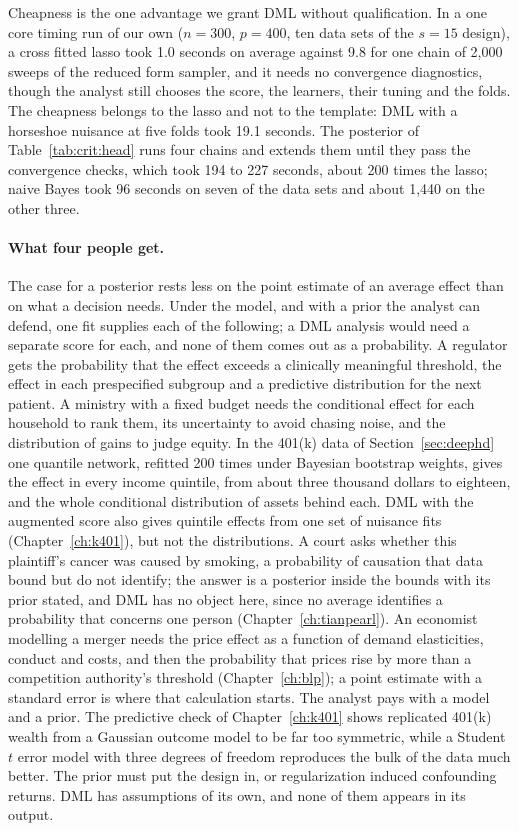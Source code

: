 Cheapness is the one advantage we grant DML without qualification. In a one core timing run of our own ($n = 300$, $p = 400$, ten data sets of the $s = 15$ design), a cross fitted lasso took 1.0 seconds on average against 9.8 for one chain of 2,000 sweeps of the reduced form sampler, and it needs no convergence diagnostics, though the analyst still chooses the score, the learners, their tuning and the folds. The cheapness belongs to the lasso and not to the template: DML with a horseshoe nuisance at five folds took 19.1 seconds. The posterior of Table~\ref{tab:crit:head} runs four chains and extends them until they pass the convergence checks, which took 194 to 227 seconds, about 200 times the lasso; naive Bayes took 96 seconds on seven of the data sets and about 1,440 on the other three.

\paragraph{What four people get.}\label{sec:crit:applied} The case for a posterior rests less on the point estimate of an average effect than on what a decision needs. Under the model, and with a prior the analyst can defend, one fit supplies each of the following; a DML analysis would need a separate score for each, and none of them comes out as a probability. A regulator gets the probability that the effect exceeds a clinically meaningful threshold, the effect in each prespecified subgroup and a predictive distribution for the next patient. A ministry with a fixed budget needs the conditional effect for each household to rank them, its uncertainty to avoid chasing noise, and the distribution of gains to judge equity. In the 401(k) data of Section~\ref{sec:deephd} one quantile network, refitted 200 times under Bayesian bootstrap weights, gives the effect in every income quintile, from about three thousand dollars to eighteen, and the whole conditional distribution of assets behind each. DML with the augmented score also gives quintile effects from one set of nuisance fits (Chapter~\ref{ch:k401}), but not the distributions. A court asks whether this plaintiff's cancer was caused by smoking, a probability of causation that data bound but do not identify; the answer is a posterior inside the bounds with its prior stated, and DML has no object here, since no average identifies a probability that concerns one person (Chapter~\ref{ch:tianpearl}). An economist modelling a merger needs the price effect as a function of demand elasticities, conduct and costs, and then the probability that prices rise by more than a competition authority's threshold (Chapter~\ref{ch:blp}); a point estimate with a standard error is where that calculation starts. The analyst pays with a model and a prior. The predictive check of Chapter~\ref{ch:k401} shows replicated 401(k) wealth from a Gaussian outcome model to be far too symmetric, while a Student $t$ error model with three degrees of freedom reproduces the bulk of the data much better. The prior must put the design in, or regularization induced confounding returns. DML has assumptions of its own, and none of them appears in its output.

